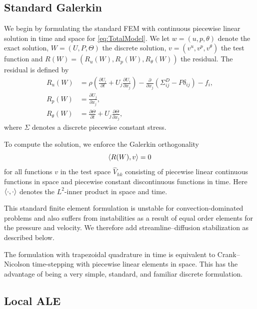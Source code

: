\subsection{Standard Galerkin}

We begin by formulating the standard \cgone{}\cgone{} FEM
\citep{ErikssonEstepHansboEtAl1996} with continuous piecewise linear
solution in time and space for \eqref{eq:TotalModel}. We let $w = (u,
  p, \theta)$ denote the exact solution, $W = (U, P, \Theta)$ the
discrete solution, $v = (v^u, v^p, v^\theta)$ the test function and
$R(W) = (R_u(W), R_p(W), R_\theta(W))$ the residual. The residual is defined by
\begin{equation} \label{eq:TotalModel}
  \begin{split}
    R_u(W) &= \rho\left(\frac{\partial U_i}{\partial t} + U_j \frac{\partial U_i}{\partial x_j} \right) - \frac{\partial}{\partial x_j} (\Sigma^D_{ij} - P \delta_{ij}) - f_i,\\
    R_p(W) &= \frac{\partial U_j}{\partial x_j},\\
    R_\theta(W) &= \frac{\partial\Theta}{\partial t} + U_j \frac{\partial \Theta}{\partial x_j},
  \end{split}
\end{equation}
where $\Sigma$ denotes a discrete piecewise constant stress.

To compute the solution, we enforce the Galerkin orthogonality
\begin{equation}
  \langle R(W), v \rangle = 0
\end{equation}
for all functions $v$ in the test space $\hat{V}_{hk}$ consisting of
piecewise linear continuous functions in space and piecewise constant
discontinuous functions in time. Here $\langle \cdot, \cdot \rangle$ denotes
the $L^2$-inner product in space and time.

This standard finite element formulation is unstable for
convection-dominated problems and also suffers from instabilities as a
result of equal order elements for the pressure and velocity. We
therefore add streamline--diffusion stabilization as described below.

The \cgone{}\cgone{} formulation with trapezoidal quadrature in time
is equivalent to Crank--Nicolson time-stepping with piecewise linear
elements in space. This has the advantage of being a very simple,
standard, and familiar discrete formulation.

\subsection{Local ALE}
\label{sec:hoffman-2:ale}

